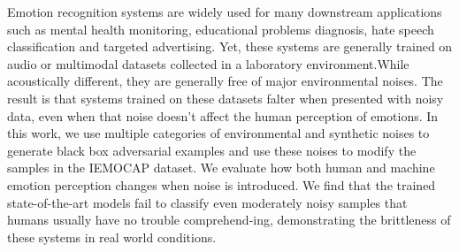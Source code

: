 Emotion recognition systems are widely used for  many  downstream  applications  such  as mental  health  monitoring,  educational  problems diagnosis, hate speech classification and targeted  advertising.   Yet,  these  systems  are generally   trained   on   audio   or   multimodal datasets collected in a laboratory environment.While acoustically different, they are generally free  of  major  environmental  noises.   The  result  is  that  systems  trained  on  these  datasets falter  when  presented  with  noisy  data,  even when that noise doesn't affect the human perception of emotions. In this work, we use multiple categories of environmental and synthetic noises to generate black box adversarial examples and use these noises to modify the samples  in  the  IEMOCAP  dataset.   We  evaluate how both human and machine emotion perception  changes  when  noise  is  introduced.   We find that the trained state-of-the-art models fail to classify even moderately noisy samples that humans usually have no trouble comprehend-ing, demonstrating the brittleness of these systems in real world conditions.
